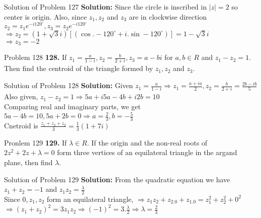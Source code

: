 \documentclass[aspectratio=169,8pt]{beamer}
\begin{document}
\begin{frame}{Solution of Problem 127}
  \textbf{Solution:} Since the circle is inscribed in $|z| = 2$ so center is origin. Also, since $z_1, z_2$ and $z_3$ are in
  clockwise direction $z_2 = z_1e^{-i120^\circ}, z_3 = z_2e^{-i120^\circ}$\\
  \vspace*{0.2cm}
  $\Rightarrow z_2 = (1 + \sqrt{3}i)[(\cos. -120^\circ + i.\sin -120^\circ)] = 1-\sqrt{3}i$\\
  \vspace*{0.2cm}
  $\Rightarrow z_3 = -2$
\end{frame}
\begin{frame}{Problem 128}
  \textbf{128.} If $z_1 = \frac{a}{1 - i}, z_2 = \frac{b}{2 + i}, z_3 = a - bi$ for $a, b\in R$ and $z_1 - z_2 = 1.$ Then find the
  centroid of the triangle formed by $z_1, z_2$ and $z_3.$
\end{frame}
\begin{frame}{Solution of Problem 128}
  \textbf{Solution:} Given $z_1 = \frac{a}{1 - i} \Rightarrow z_1 = \frac{a + ia}{2}, z_2 = \frac{b}{2 + i} = \frac{2b - ib}{5}$\\
  \vspace*{0.2cm}
  Also given, $z_1 - z_2 = 1 \Rightarrow 5a + i5a - 4b + i2b = 10$\\
  \vspace*{0.2cm}
  Comparing real and imaginary parts, we get $5a - 4b = 10, 5a + 2b = 0 \Rightarrow a = \frac{2}{3}, b = -\frac{5}{3}$\\
  \vspace*{0.2cm}
  Cnetroid is $\frac{z_1 + z_2 + z_3}{3} = \frac{1}{3}(1 + 7i)$
\end{frame}
\begin{frame}{Pronlem 129}
  \textbf{129.} If $\lambda \in R.$ If the origin and the non-real roots of $2z^2 + 2z + \lambda = 0$ form three vertices of an
  equilateral triangle in the argand plane, then find $\lambda.$
\end{frame}
\begin{frame}{Solution of Problem 129}
  \textbf{Solution:} From the quadratic equation we have $z_1 + z_2 = -1$ and $z_1z_2 = \frac{\lambda}{2}$\\
  \vspace*{0.2cm}
  Since $0, z_1, z_2$ form an equilateral triangle, $\Rightarrow z_1z_2 + z_2.0 + z_1.0 = z_1^2 + z_2^2 + 0^2$\\
  \vspace*{0.2cm}
  $\Rightarrow (z_1 + z_2)^2 = 3z_1z_2 \Rightarrow (-1)^2 = 3.\frac{\lambda}{2}\Rightarrow \lambda = \frac{2}{3}$
\end{frame}
\end{document}
